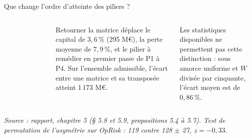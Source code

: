 \documentclass[aspectratio=169,10pt,t]{beamer}
\newcommand{\source}[1]{\par\vfill{\tiny\color{gris}\textit{Source : #1}}\par\vspace{-1mm}}
\begin{document}
\begin{frame}{Que change l'ordre d'atteinte des piliers ?}
\begin{columns}[T,onlytextwidth]
\begin{tabular}{@{}lrr@{}}
      \bottomrule
    \end{tabular}\par\vspace{1.2mm}
    Retourner la matrice déplace le capital de $3{,}6\,\%$ (295 M€), la perte moyenne de $7{,}9\,\%$, et le pilier à remédier en premier passe de P1 à P4. Sur l'ensemble admissible, l'écart entre une matrice et sa transposée atteint 1\,173 M€.\par\vspace{1mm}
    {\color{accent}Les statistiques disponibles ne permettent pas cette distinction} : sous amorce uniforme et $W$ divisée par cinquante, l'écart moyen est de $0{,}86\,\%$.
  \end{columns}
  \source{rapport, chapitre 5 (§ 5.8 et 5.9, propositions 5.4 à 5.7). Test de permutation de l'asymétrie sur OpRisk : 119 contre 128 $\pm$ 27, $z=-0{,}33$.}
\end{frame}
\end{document}
